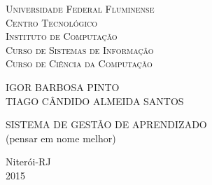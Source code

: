 
\begin{titlepage}
  \begin{center}
    \Large{\textsc{Universidade Federal Fluminense} \\
           \textsc{Centro Tecnológico} \\ 
           \textsc{Instituto de Computação} \\
           \textsc{Curso de Sistemas de Informação} \\
            \textsc{Curso de Ciência da Computação}
          }
    \par\vfill
    \LARGE{IGOR BARBOSA PINTO}\\
    \LARGE{TIAGO CÂNDIDO ALMEIDA SANTOS}
    \par\vfill
    \LARGE{SISTEMA DE GESTÃO DE APRENDIZADO \\ (pensar em nome melhor)}
    \par\vfill
    \Large{Niterói-RJ\\2015}
  \end{center}
\end{titlepage}